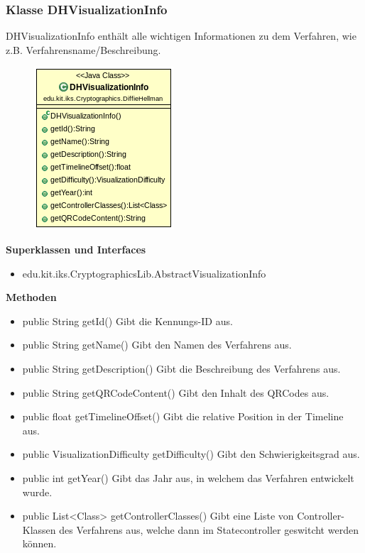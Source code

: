 \documentclass{article}
\begin{document}
\subsubsection{Klasse DHVisualizationInfo}
      DHVisualizationInfo enthält alle wichtigen Informationen zu dem Verfahren, wie z.B. Verfahrensname/Beschreibung.
      \begin{figure}[H]
        \centering
        \includegraphics{resources/edu-kit-iks-Cryptographics-DiffieHellman-DHVisualizationInfo}
      \end{figure}

      \textbf{Superklassen und Interfaces}
      \begin{itemize}
        \item edu.kit.iks.CryptographicsLib.AbstractVisualizationInfo
      \end{itemize}
      
      \textbf{Methoden}
      \begin{itemize}
        \item public String getId() \newline
        Gibt die Kennungs-ID aus.
        \item public String getName() \newline
        Gibt den Namen des Verfahrens aus.
        \item public String getDescription() \newline
        Gibt die Beschreibung des Verfahrens aus.
        \item public String getQRCodeContent() \newline
        Gibt den Inhalt des QRCodes aus.
        \item public float getTimelineOffset() \newline
        Gibt die relative Position in der Timeline aus.
        \item public VisualizationDifficulty getDifficulty() \newline
        Gibt den Schwierigkeitsgrad aus.
        \item public int getYear() \newline
        Gibt das Jahr aus, in welchem das Verfahren entwickelt wurde.
        \item public List<Class> getControllerClasses() \newline
        Gibt eine Liste von Controller-Klassen des Verfahrens aus, welche dann im Statecontroller geswitcht werden können.
      \end{itemize}
\end{document}
